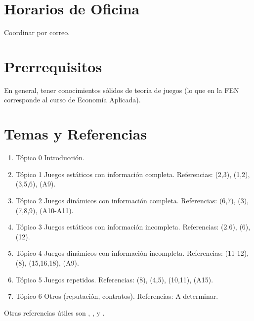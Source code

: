 \documentclass[11pt]{article}
\begin{document}
\section*{Horarios de Oficina}
Coordinar por correo.

\section*{Prerrequisitos}
En general, tener conocimientos s\'olidos de teor\'ia de juegos (lo que en la FEN corresponde al curso de Econom\'ia Aplicada).

\section*{Temas y Referencias}

\begin{enumerate}

  \item T\'opico 0 Introducci\'on.

  \item T\'opico 1 Juegos est\'aticos con informaci\'on completa. Referencias: \cite{osborne1994course} (2,3), \cite{fudenberg1991game} (1,2), \cite{tadelis2013game} (3,5,6), \cite{kreps2023microeconomic} (A9).

  \item T\'opico 2 Juegos din\'amicos con informaci\'on completa. Referencias: \cite{osborne1994course} (6,7), \cite{fudenberg1991game} (3), \cite{tadelis2013game} (7,8,9), \cite{kreps2023microeconomic} (A10-A11).


  \item T\'opico 3 Juegos est\'aticos con informaci\'on incompleta. Referencias: \cite{osborne1994course} (2.6), \cite{fudenberg1991game} (6), \cite{tadelis2013game} (12).


  \item T\'opico 4 Juegos din\'amicos con informaci\'on incompleta. Referencias: \cite{osborne1994course} (11-12), \cite{fudenberg1991game} (8), \cite{tadelis2013game} (15,16,18), \cite{kreps2023microeconomic} (A9).


  \item T\'opico 5 Juegos repetidos. Referencias: \cite{osborne1994course} (8), \cite{fudenberg1991game} (4,5), \cite{tadelis2013game} (10,11), \cite{kreps2023microeconomic} (A15).

  \item T\'opico 6 Otros (reputaci\'on, contratos). Referencias: A determinar.
\end{enumerate}

Otras referencias \'utiles son \cite{mas1995microeconomic}, \cite{mailath2006repeated}, \cite{kartiklecture2012} y \cite{mailath2018modeling}.



\end{document}
